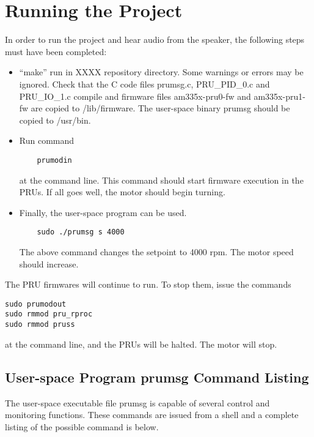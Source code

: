 \chapter{Running the Project}

In order to run the project and hear audio from the speaker, the following steps must have been completed:

\begin{itemize}
	\item ``make'' run in XXXX repository directory.  Some warnings or errors may be ignored.  Check that the C code files prumsg.c, PRU\_PID\_0.c and PRU\_IO\_1.c compile and firmware files am335x-pru0-fw and am335x-pru1-fw are copied to /lib/firmware.  The user-space binary prumsg should be copied to /usr/bin.
	
	\item Run command 
	
	\begin{verbatim}
	prumodin
	\end{verbatim} 
	
	at the command line.  This command should start firmware execution in the PRUs.
	If all goes well, the motor should begin turning.
	
	\item  Finally, the user-space program can be used.
	
	\begin{verbatim}
	sudo ./prumsg s 4000
	\end{verbatim}
	
	The above command changes the setpoint to 4000 rpm.  The motor speed should increase.
\end{itemize}

The PRU firmwares will continue to run.  To stop them, issue the commands

\begin{verbatim}
sudo prumodout
sudo rmmod pru_rproc
sudo rmmod pruss
\end{verbatim}

at the command line, and the PRUs will be halted.  The motor will stop.

\section{User-space Program prumsg Command Listing}

The user-space executable file prumsg is capable of several control and monitoring functions.  These commands are issued from a shell and a complete listing of the possible command is below.

